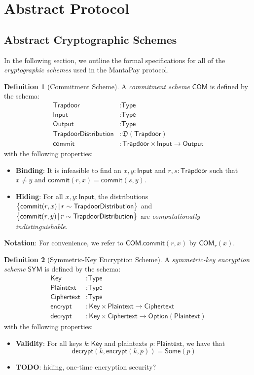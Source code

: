 \documentclass[a4paper]{article}
\newcommand{\lsection}[2]{\def\sectionlabel{#2} \section{#1}\label{sec:#2}}
\newcommand{\TODO}[1]{{\color{red}\textbf{TODO}}: #1}
\theoremstyle{definition}
\newtheorem{definition}{Definition}[subsection]
\newcommand{\COM}{{\textsf{COM}}}
\newcommand{\Ciphertext}{{\textsf{Ciphertext}}}
\newcommand{\Input}{{\textsf{Input}}}
\newcommand{\Key}{{\textsf{Key}}}
\newcommand{\MantaPay}{{\textsf{MantaPay}}}
\newcommand{\Option}{{\textsf{Option}}}
\newcommand{\Output}{{\textsf{Output}}}
\newcommand{\Plaintext}{{\textsf{Plaintext}}}
\newcommand{\SYM}{{\textsf{SYM}}}
\newcommand{\Some}{{\textsf{Some}}}
\newcommand{\TrapdoorDistribution}{{\textsf{TrapdoorDistribution}}}
\newcommand{\Trapdoor}{{\textsf{Trapdoor}}}
\newcommand{\Type}{{\textsf{Type}}}
\newcommand{\commit}{{\textsf{commit}}}
\newcommand{\decrypt}{{\textsf{decrypt}}}
\newcommand{\encrypt}{{\textsf{encrypt}}}
\begin{document}
\lsection{Abstract Protocol}{abstract-protocol}

\subsection{Abstract Cryptographic Schemes}

In the following section, we outline the formal specifications for all of the \emph{cryptographic schemes} used in the \MantaPay{} protocol.

\begin{definition}[Commitment Scheme]
    A \emph{commitment scheme} $\COM$ is defined by the schema:
    \begin{align*}
        \Trapdoor             &: \Type \\
        \Input                &: \Type \\
        \Output               &: \Type \\
        \TrapdoorDistribution &: \mathfrak{D}(\Trapdoor) \\
        \commit               &: \Trapdoor \times \Input \to \Output
    \end{align*}
    with the following properties:
    \begin{itemize}
        \item \textbf{Binding}: It is infeasible to find an $x, y : \Input$ and $r, s: \Trapdoor$ such that $x \ne y$ and $\commit(r,x) = \commit(s,y)$.
        \item \textbf{Hiding}: For all $x, y : \Input$, the distributions $\set{\commit(r,x) \,|\, r \sim \TrapdoorDistribution}$ and \\ $\set{\commit(r,y) \,|\, r \sim \TrapdoorDistribution}$ are \emph{computationally indistinguishable}.
    \end{itemize}

    \textbf{Notation}: For convenience, we refer to $\COM.\commit(r,x)$ by $\COM_r(x)$.
\end{definition}

\begin{definition}[Symmetric-Key Encryption Scheme]
    A \emph{symmetric-key encryption scheme} $\SYM$ is defined by the schema:
    \begin{align*}
        \Key &: \Type \\
        \Plaintext &: \Type \\
        \Ciphertext &: \Type \\
        \encrypt &: \Key \times \Plaintext \to \Ciphertext \\
        \decrypt &: \Key \times \Ciphertext \to \Option(\Plaintext)
    \end{align*}
    with the following properties:
    \begin{itemize}
        \item \textbf{Validity}: For all keys $k : \Key$ and plaintexts $p : \Plaintext$, we have that
            \[\decrypt(k, \encrypt(k, p)) = \Some(p)\]
        \item \TODO{hiding, one-time encryption security?}
    \end{itemize}
\end{definition}
\end{document}
